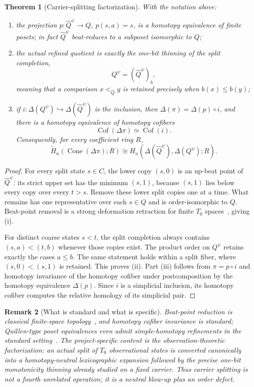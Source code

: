 \documentclass[11pt]{article}
\newtheorem{theorem}{Theorem}[section]
\newtheorem{remark}[theorem]{Remark}
\newcommand{\Cone}{\operatorname{Cone}}
\begin{document}
\begin{theorem}[Carrier-splitting factorization]\label{thm:split-factorization}
With the notation above:
\begin{enumerate}[label=(\roman*)]
\item the projection $p:\widehat Q^\psi\to Q$, $p(s,a)=s$, is a homotopy
  equivalence of finite posets; in fact $\widehat Q^\psi$ beat-reduces to a
  subposet isomorphic to $Q$;
\item the actual refined quotient is exactly the one-bit thinning of the split
  completion,
  \[
    Q^\psi=(\widehat Q^\psi)_b,
  \]
  meaning that a comparison $x<_{\widehat Q}y$ is retained precisely when
  $b(x)\leq b(y)$;
\item if $i:\Delta(Q^\psi)\hookrightarrow\Delta(\widehat Q^\psi)$ is the
  inclusion, then $\Delta(\pi)=\Delta(p)\circ i$, and there is a homotopy
  equivalence of homotopy cofibers
  \[
  \operatorname{Cof}(\Delta\pi)\simeq
  \operatorname{Cof}(i).
  \]
  Consequently, for every coefficient ring $R$,
  \[
  \widetilde H_n\!\left(\Cone(\Delta\pi);R\right)
  \cong
  H_n\!\left(\Delta(\widehat Q^\psi),\Delta(Q^\psi);R\right).
  \]
\end{enumerate}
\end{theorem}

\begin{proof}
For every split state $s\in C$, the lower copy $(s,0)$ is an up-beat point of
$\widehat Q^\psi$: its strict upper set has the minimum $(s,1)$, because
$(s,1)$ lies below every copy over every $t>s$.  Remove these lower split
copies one at a time.  What remains has one representative over each $s\in Q$
and is order-isomorphic to $Q$.  Beat-point removal is a strong deformation
retraction for finite $T_0$ spaces~\cite{Stong1966}, giving (i).

For distinct coarse states $s<t$, the split completion always contains
$(s,a)<(t,b)$ whenever those copies exist.  The product order on $Q^\psi$
retains exactly the cases $a\leq b$.  The same statement holds within a split
fiber, where $(s,0)<(s,1)$ is retained.  This proves (ii).  Part (iii) follows
from $\pi=p\circ i$ and homotopy invariance of the homotopy cofiber under
postcomposition by the homotopy equivalence $\Delta(p)$.  Since $i$ is a
simplicial inclusion, its homotopy cofiber computes the relative homology of
its simplicial pair.
\end{proof}

\begin{remark}[What is standard and what is specific]
Beat-point reduction is classical finite-space topology~\cite{Stong1966}, and homotopy cofiber
invariance is standard; Quillen-type poset equivalences even admit simple-homotopy refinements in the standard setting~\cite{Barmak2011}.  The project-specific content is the observation-theoretic
factorization: an actual split of $T_0$ observational states is converted canonically
into a homotopy-neutral lexicographic expansion followed by the precise one-bit
monotonicity thinning already studied on a fixed carrier.  Thus carrier splitting
is not a fourth unrelated operation; it is a neutral blow-up plus an order defect.
\end{remark}
\end{document}
